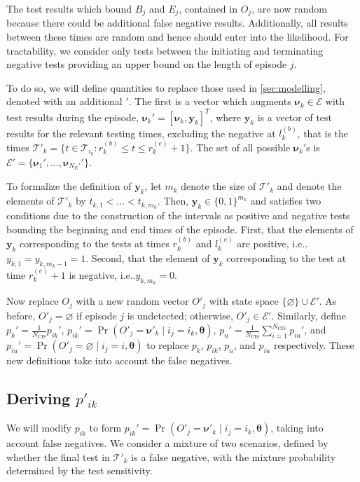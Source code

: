 \documentclass[referee,useAMS,usenatbib]{biom}
\makeatletter
\DeclareMathOperator{\prob}{\mathrm{Pr}}
\newcommand\set{\mathcal}
\renewcommand{\vec}[1]{\bm{#1}}
\newcommand{\ssep}{:}
\newcommand{\Ncis}{N_\text{CIS}}
\newcommand{\sched}{\mathcal{T}}
\DeclareRobustCommand\onedot{\futurelet\@let@token\@onedot}
\def\@onedot{\ifx\@let@token.\else.\null\fi\xspace}
\def\ie{i.e\onedot} \def\Ie{{I.e}\onedot}
\makeatother
\begin{document}
The test results which bound $B_j$ and $E_j$, contained in $O_j$, are now random because there could be additional false negative results.
Additionally, all results between these times are random and hence should enter into the likelihood.
For tractability, we consider only tests between the initiating and terminating negative tests providing an upper bound on the length of episode $j$.

To do so, we will define quantities to replace those used in \cref{sec:modelling}, denoted with an additional $'$.
The first is a vector which augments $\vec{\nu}_k \in \set{E}$ with test results during the episode, $\vec{\nu}_k' = [\vec{\nu}_k, \vec{y}_k]^T$, where $\vec{y}_k$ is a vector of test results for the relevant testing times, excluding the negative at $l^{(b)}_k$, that is the times $\sched'_k = \{ t \in \sched_{i_k} \ssep r_k^{(b)} \leq t \leq r_k^{(e)} + 1 \}$.
The set of all possible $\vec{\nu}_k'$s is $\set{E}' = \{ \vec{\nu}_1', \dots, \vec{\nu}_{N_E'}' \}$.

To formalize the definition of $\vec{y}_k$, let $m_k$ denote the size of $\sched'_k$ and denote the elements of $\sched'_k$ by $t_{k,1} < \dots < t_{k,m_k}$.
Then, $\vec{y}_k \in \{0, 1\}^{m_k}$ and satisfies two conditions due to the construction of the intervals as positive and negative tests bounding the beginning and end times of the episode.
First, that the elements of $\vec{y}_k$ corresponding to the tests at times $r_k^{(b)}$ and $l_k^{(e)}$ are positive, \ie $y_{k,1} = y_{k,m_k-1} = 1$.
Second, that the element of $\vec{y}_k$ corresponding to the test at time $r_k^{(e)} + 1$ is negative, \ie $y_{k,m_k} = 0$.

Now replace $O_j$ with a new random vector $O'_j$ with state space $\{\varnothing\} \cup \set{E}'$.
As before, $O'_j = \varnothing$ if episode $j$ is undetected; otherwise, $O'_j \in \set{E}'$.
Similarly, define $p_k' = \frac{1}{\Ncis} p_{ik}'$, $p_{ik}' = \prob(O'_j = \vec{\nu}'_k \mid i_j = i_k, \vec{\theta})$, $p_u' = \frac{1}{\Ncis} \sum_{i=1}^{\Ncis} p_{iu}'$, and $p_{iu}' = \prob(O'_j = \varnothing \mid i_j = i, \vec{\theta})$ to replace $p_k$, $p_{ik}$, $p_u$, and $p_{iu}$ respectively.
These new definitions take into account the false negatives.

\subsection{Deriving $p'_{ik}$} \label{imperf-test:sec:modifying-p_ia}

We will modify $p_{ik}$ to form $p_{ik}' = \prob(O'_j = \vec{\nu}'_k \mid i_j = i_k, \vec{\theta})$, taking into account false negatives.
We consider a mixture of two scenarios, defined by whether the final test in $\sched'_{k}$ is a false negative, with the mixture probability determined by the test sensitivity.
\end{document}
